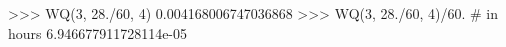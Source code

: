 
>>> WQ(3, 28./60, 4)
0.004168006747036868
>>> WQ(3, 28./60, 4)/60. # in hours
6.946677911728114e-05


